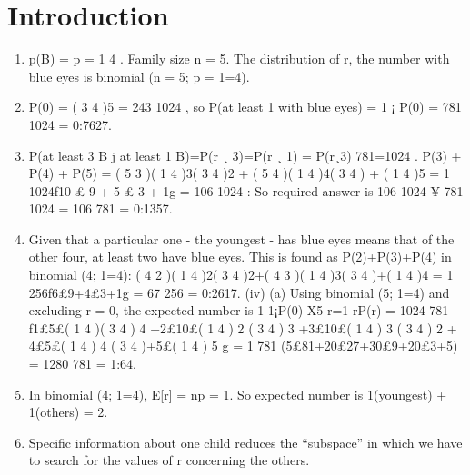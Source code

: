\documentclass{article}
\begin{document}
\section{Introduction}
\begin{enumerate}
\item p(B) = p = 1
4 . Family size n = 5. The distribution of r, the number with blue
eyes is binomial (n = 5; p = 1=4).
\item P(0) = ( 3
4 )5 = 243
1024 , so P(at least 1 with blue eyes) = 1 ¡ P(0) = 781
1024 =
0:7627.
\item  P(at least 3 B j at least 1 B)=P(r ¸ 3)=P(r ¸ 1) = P(r¸3)
781=1024 .
P(3) + P(4) + P(5) = ( 5
3 )( 1
4 )3( 3
4 )2 + ( 5
4 )( 1
4 )4( 3
4 ) + ( 1
4 )5
= 1
1024f10 £ 9 + 5 £ 3 + 1g = 106
1024 :
So required answer is 106
1024 ¥ 781
1024 = 106
781 = 0:1357.
\item Given that a particular one - the youngest - has blue eyes means that of the
other four, at least two have blue eyes. This is found as P(2)+P(3)+P(4) in
binomial (4; 1=4): ( 4
2 )( 1
4 )2( 3
4 )2+( 4
3 )( 1
4 )3( 3
4 )+( 1
4 )4 = 1
256f6£9+4£3+1g
= 67
256 = 0:2617.
(iv) (a) Using binomial (5; 1=4) and excluding r = 0, the expected number is
1
1¡P(0)
X5
r=1
rP(r) =
1024
781
f1£5£(
1
4
)(
3
4
)
4
+2£10£(
1
4
)
2
(
3
4
)
3
+3£10£(
1
4
)
3
(
3
4
)
2
+
4£5£(
1
4
)
4
(
3
4
)+5£(
1
4
)
5
g =
1
781
(5£81+20£27+30£9+20£3+5) =
1280
781
= 1:64.

\item In binomial (4; 1=4), E[r] = np = 1.
So expected number is 1(youngest) + 1(others) = 2.
\item Specific information about one child reduces the “subspace” in which we
have to search for the values of r concerning the others.
\end{enumerate}
\end{document}
